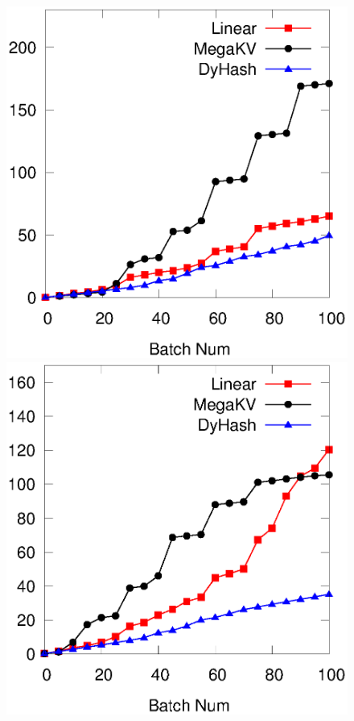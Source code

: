 \begin{figure}[htp]
\begin{minipage}{0.19\linewidth}
		\centerline{\dsreddit}
	\end{minipage}
	\begin{minipage}{0.19\linewidth}\centering
		\includegraphics[width=\linewidth]{pic/dynamic-stability/dynamic-sta-tpch.eps}
		\centerline{\dstpch}
	\end{minipage}
	\begin{minipage}{0.19\linewidth}\centering
		\includegraphics[width=\linewidth]{pic/dynamic-stability/dynamic-sta-ali.eps}

\end{minipage}
\end{figure}
